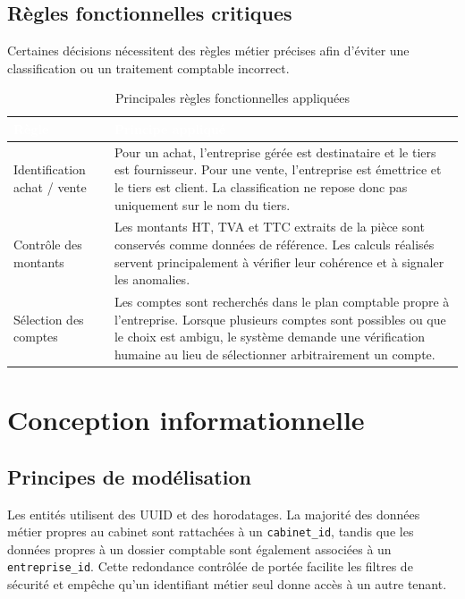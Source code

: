 \documentclass[12pt,a4paper,oneside]{report}
\newcommand{\TableSetup}{%
  \arrayrulecolor{ComptaTableLine}%
  \setlength{\arrayrulewidth}{0.45pt}%
  \renewcommand{\arraystretch}{1.18}%
}
\newcommand{\TableHead}[1]{\textcolor{white}{\textbf{#1}}}
\begin{document}
\subsection{Règles fonctionnelles critiques}

Certaines décisions nécessitent des règles métier précises afin d'éviter une classification ou un traitement comptable incorrect.

\begin{table}[H]
\centering
\caption{Principales règles fonctionnelles appliquées}
\label{tab:regles-fonctionnelles-critiques}
\TableSetup
\begin{tabularx}{\textwidth}{|L{4.1cm}|Y|}
\toprule
{}\TableHead{Règle} & \TableHead{Principe appliqué} \\
\midrule
Identification achat / vente & Pour un achat, l'entreprise gérée est destinataire et le tiers est fournisseur. Pour une vente, l'entreprise est émettrice et le tiers est client. La classification ne repose donc pas uniquement sur le nom du tiers. \\
Contrôle des montants & Les montants HT, TVA et TTC extraits de la pièce sont conservés comme données de référence. Les calculs réalisés servent principalement à vérifier leur cohérence et à signaler les anomalies. \\
Sélection des comptes & Les comptes sont recherchés dans le plan comptable propre à l'entreprise. Lorsque plusieurs comptes sont possibles ou que le choix est ambigu, le système demande une vérification humaine au lieu de sélectionner arbitrairement un compte. \\
\bottomrule
\end{tabularx}
\end{table}

\section{Conception informationnelle}

\subsection{Principes de modélisation}

Les entités utilisent des UUID et des horodatages. La majorité des données métier propres au cabinet sont rattachées à un \texttt{cabinet\_id}, tandis que les données propres à un dossier comptable sont également associées à un \texttt{entreprise\_id}. Cette redondance contrôlée de portée facilite les filtres de sécurité et empêche qu'un identifiant métier seul donne accès à un autre tenant.
\end{document}
